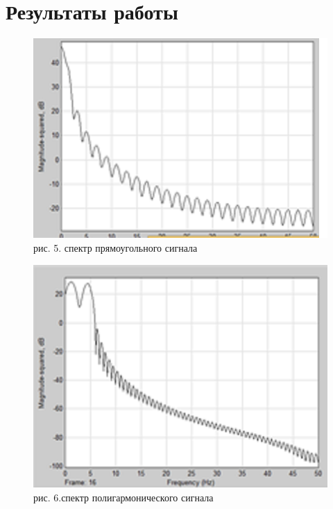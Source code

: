 \documentclass[10pt,a4paper]{report}
\begin{document}
\section{Результаты работы}
\begin{figure}
\begin{center}
\includegraphics[angle=0, scale = 0.9]{5.png}\newline
рис. 5. спектр прямоугольного сигнала\newline
\end{center}
\end{figure}
\begin{figure}
\begin{center}
\includegraphics[angle=0, scale = 0.7]{6.png}\newline
рис. 6.спектр полигармонического сигнала\newline
\end{center}
\end{figure}
\end{document}
